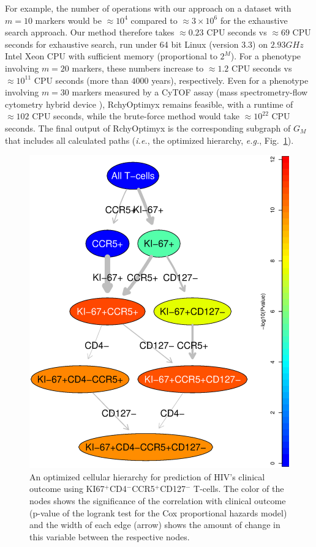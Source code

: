 For example, the number of operations with our approach on a dataset with $m=10$ markers would be $\approx 10^4$
compared to $\approx 3 \times 10^{6}$ for the exhaustive search approach.  
Our method therefore takes
$\approx 0.23$ CPU seconds vs $\approx 69$ CPU seconds for exhaustive search, run under 64 bit Linux (version 3.3) on $2.93GHz$
Intel Xeon CPU with sufficient memory (proportional to $2^M$). 
For a phenotype involving $m=20$ markers, these numbers increase to $\approx 1.2$ CPU seconds vs $\approx 10^{11}$ CPU
seconds (more than $4000$ years), respectively.  Even for a phenotype involving $m=30$ markers measured by a CyTOF assay
(mass spectrometry-flow cytometry hybrid device \cite{ornatsky2010highly,bendall2011single,Chattopadhyay2012Cytometry}),
RchyOptimyx remains feasible, with a runtime of $\approx 102$ CPU seconds, while the brute-force method would take
$\approx 10^{22}$ CPU seconds.  The final output of RchyOptimyx is the corresponding subgraph of $G_M$ that includes all
calculated paths (\emph{i.e.}, the optimized hierarchy, \emph{e.g.}, Fig.~\ref{r1:HIVClinicalOutcome}).

  \begin{figure}[ht]
    \begin{center}
      \includegraphics[width=.7\textwidth]{figs/rchy/figs/HIVClinicalOutcome}
    \end{center}
    \caption{An optimized cellular hierarchy for prediction of HIV's clinical outcome using KI67$^+$CD4$^-$CCR5$^+$CD127$^-$ T-cells. 
The color of the nodes shows the significance of the correlation with clinical outcome (p-value of the logrank test for the Cox proportional hazards model) and the width of each edge (arrow) shows the amount of change in this variable between the respective nodes. 
}
    \label{r1:HIVClinicalOutcome}
  \end{figure}


